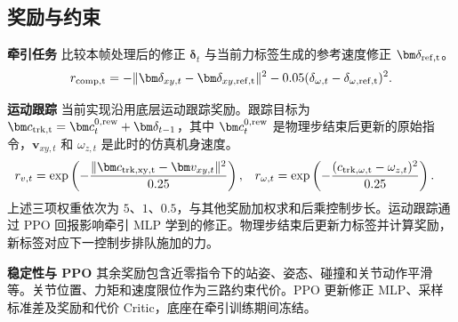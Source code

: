 \subsection{奖励与约束}

\noindent\textbf{牵引任务}\quad
{} 比较本帧处理后的修正 $\bm\delta_t$ 与当前力标签生成的参考速度修正 $\bm\delta_{\rm ref,t}$。
\begin{equation}
 r_{\rm comp,t}=-\|\bm\delta_{xy,t}-\bm\delta_{xy,\rm ref,t}\|^2
 -0.05(\delta_{\omega,t}-\delta_{\omega,\rm ref,t})^2.
\label{eq:comp}
\end{equation}

\noindent\textbf{运动跟踪}\quad
当前实现沿用底层运动跟踪奖励。跟踪目标为 $\bm c_{\rm trk,t}=\bm c^{0,\rm rew}_t+\bm\delta_{t-1}$，其中 $\bm c^{0,\rm rew}_t$ 是物理步结束后更新的原始指令，$\bm v_{xy,t}$ 和 $\omega_{z,t}$ 是此时的仿真机身速度。
\begin{align}
 r_{v,t}&=\exp\left(-\frac{\|\bm c_{\rm trk,xy,t}-\bm v_{xy,t}\|^2}{0.25}\right),&
 r_{\omega,t}&=\exp\left(-\frac{(c_{\rm trk,\omega,t}-\omega_{z,t})^2}{0.25}\right).
\end{align}
上述三项权重依次为 $5$、$1$、$0.5$，与其他奖励加权求和后乘控制步长。运动跟踪通过 PPO 回报影响牵引 MLP 学到的修正。物理步结束后更新力标签并计算奖励，新标签对应下一控制步排队施加的力。

\noindent\textbf{稳定性与 PPO}\quad
其余奖励包含近零指令下的站姿、姿态、碰撞和关节动作平滑等。关节位置、力矩和速度限位作为三路约束代价。PPO 更新修正 MLP、采样标准差及奖励和代价 Critic，底座在牵引训练期间冻结。\cite{schulman2017}
